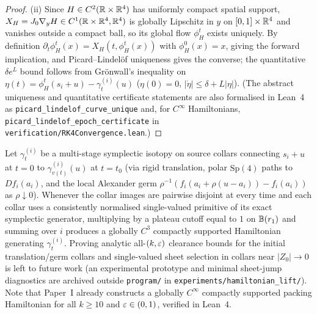 \begin{proof}
(ii) Since $H\in C^2(\mathbb{R}\times\mathbb{R}^4)$ has uniformly compact spatial support, $X_H=J_0\nabla_yH\in C^1(\mathbb{R}\times\mathbb{R}^4,\mathbb{R}^4)$
is globally Lipschitz in $y$ on $[0,1]\times\mathbb{R}^4$ and vanishes outside a compact ball, so its global flow $\phi_H^t$
exists uniquely. By definition $\partial_t\phi_H^t(x)=X_H(t,\phi_H^t(x))$ with $\phi_H^0(x)=x$, giving the forward
implication, and Picard--Lindel\"of uniqueness gives the converse; the quantitative $\delta e^L$ bound follows from
Gr\"onwall's inequality on $\eta(t)=\phi_H^t(s_i+u)-\gamma_t^{(i)}(u)$ ($\eta(0)=0$, $|\dot\eta|\le\delta+L|\eta|$).
(The abstract uniqueness and quantitative certificate statements are also formalised in Lean~4 as
\texttt{picard\_lindelof\_curve\_unique} and, for $C^\infty$ Hamiltonians, \texttt{picard\_lindelof\_epoch\_certificate}
in \texttt{verification/RK4Convergence.lean}.)
\end{proof}

\begin{remark}\label{rem:lift-scope}
Let $\gamma_t^{(i)}$ be a multi-stage symplectic isotopy on source collars connecting $s_i+u$ at $t=0$ to
$\gamma_{v(t)}^{(i)}(u)$ at $t=t_0$ (via rigid translation, polar $\mathrm{Sp}(4)$ paths to $Df_i(a_i)$, and the local
Alexander germ $\rho^{-1}(f_i(a_i+\rho(u-a_i))-f_i(a_i))$ as $\rho\downarrow0$). Whenever the collar images are pairwise
disjoint at every time and each collar uses a consistently normalised single-valued primitive of its exact symplectic
generator, multiplying by a plateau cutoff equal to $1$ on $\mathbb{B}(r_1)$ and summing over $i$ produces a globally $C^3$
compactly supported Hamiltonian generating $\gamma_t^{(i)}$. Proving analytic all-$(k,\varepsilon)$ clearance bounds for the
initial translation/germ collars and single-valued sheet selection in collars near $|Z_0|\to0$ is left to future work
(an experimental prototype and minimal sheet-jump diagnostics are archived outside \texttt{program/} in
\texttt{experiments/hamiltonian\_lift/}). Note that Paper~I already constructs a globally $C^\infty$ compactly supported
packing Hamiltonian for all $k\ge10$ and $\varepsilon\in(0,1)$, verified in Lean~4.
\end{remark}

